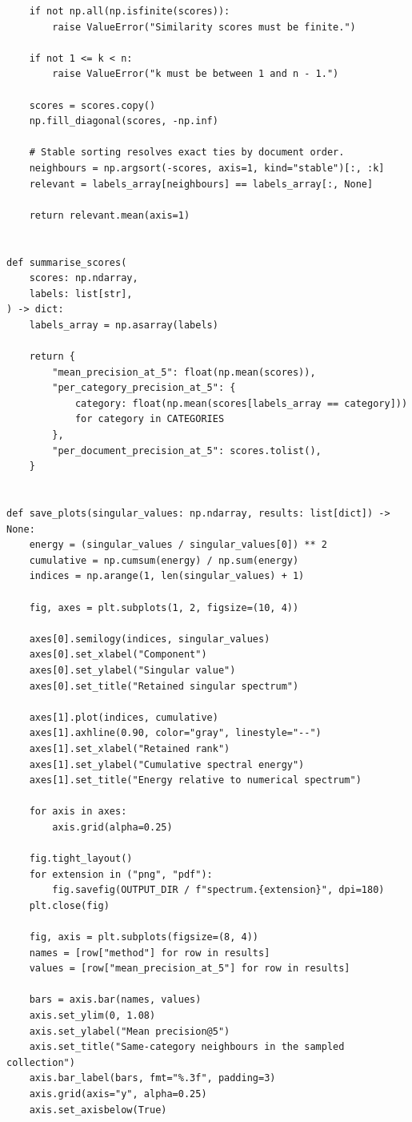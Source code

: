 \documentclass[12pt,a4paper]{report}
\theoremstyle{plain}
\theoremstyle{definition}
\theoremstyle{remark}
\theoremstyle{definition}
\begin{document}
\begin{lstlisting}
    if not np.all(np.isfinite(scores)):
        raise ValueError("Similarity scores must be finite.")

    if not 1 <= k < n:
        raise ValueError("k must be between 1 and n - 1.")

    scores = scores.copy()
    np.fill_diagonal(scores, -np.inf)

    # Stable sorting resolves exact ties by document order.
    neighbours = np.argsort(-scores, axis=1, kind="stable")[:, :k]
    relevant = labels_array[neighbours] == labels_array[:, None]

    return relevant.mean(axis=1)


def summarise_scores(
    scores: np.ndarray,
    labels: list[str],
) -> dict:
    labels_array = np.asarray(labels)

    return {
        "mean_precision_at_5": float(np.mean(scores)),
        "per_category_precision_at_5": {
            category: float(np.mean(scores[labels_array == category]))
            for category in CATEGORIES
        },
        "per_document_precision_at_5": scores.tolist(),
    }


def save_plots(singular_values: np.ndarray, results: list[dict]) -> None:
    energy = (singular_values / singular_values[0]) ** 2
    cumulative = np.cumsum(energy) / np.sum(energy)
    indices = np.arange(1, len(singular_values) + 1)

    fig, axes = plt.subplots(1, 2, figsize=(10, 4))

    axes[0].semilogy(indices, singular_values)
    axes[0].set_xlabel("Component")
    axes[0].set_ylabel("Singular value")
    axes[0].set_title("Retained singular spectrum")

    axes[1].plot(indices, cumulative)
    axes[1].axhline(0.90, color="gray", linestyle="--")
    axes[1].set_xlabel("Retained rank")
    axes[1].set_ylabel("Cumulative spectral energy")
    axes[1].set_title("Energy relative to numerical spectrum")

    for axis in axes:
        axis.grid(alpha=0.25)

    fig.tight_layout()
    for extension in ("png", "pdf"):
        fig.savefig(OUTPUT_DIR / f"spectrum.{extension}", dpi=180)
    plt.close(fig)

    fig, axis = plt.subplots(figsize=(8, 4))
    names = [row["method"] for row in results]
    values = [row["mean_precision_at_5"] for row in results]

    bars = axis.bar(names, values)
    axis.set_ylim(0, 1.08)
    axis.set_ylabel("Mean precision@5")
    axis.set_title("Same-category neighbours in the sampled collection")
    axis.bar_label(bars, fmt="%.3f", padding=3)
    axis.grid(axis="y", alpha=0.25)
    axis.set_axisbelow(True)


\end{lstlisting}
\end{document}
